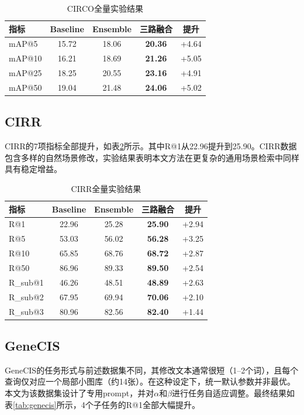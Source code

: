 \documentclass[12pt,a4paper,UTF8,oneside,openany]{ctexrep}
\begin{document}
\begin{table}[htbp]
\centering
\caption{CIRCO全量实验结果}
\label{tab:circo}
\small
\begin{tabular}{lcccc}
\toprule
指标 & Baseline & Ensemble & 三路融合 & 提升 \\
\midrule
mAP@5  & 15.72 & 18.06 & \textbf{20.36} & +4.64 \\
mAP@10 & 16.21 & 18.69 & \textbf{21.26} & +5.05 \\
mAP@25 & 18.25 & 20.55 & \textbf{23.16} & +4.91 \\
mAP@50 & 19.04 & 21.48 & \textbf{24.06} & +5.02 \\
\bottomrule
\end{tabular}
\end{table}


\subsection{CIRR}

CIRR的7项指标全部提升，如表\ref{tab:cirr}所示。其中R@1从22.96提升到25.90。CIRR数据包含多样的自然场景修改，实验结果表明本文方法在更复杂的通用场景检索中同样具有稳定增益。

\begin{table}[htbp]
\centering
\caption{CIRR全量实验结果}
\label{tab:cirr}
\small
\begin{tabular}{lcccc}
\toprule
指标 & Baseline & Ensemble & 三路融合 & 提升 \\
\midrule
R@1      & 22.96 & 25.28 & \textbf{25.90} & +2.94 \\
R@5      & 53.03 & 56.02 & \textbf{56.28} & +3.25 \\
R@10     & 65.85 & 68.76 & \textbf{68.72} & +2.87 \\
R@50     & 86.96 & 89.33 & \textbf{89.50} & +2.54 \\
R\_sub@1 & 46.26 & 48.51 & \textbf{48.89} & +2.63 \\
R\_sub@2 & 67.95 & 69.94 & \textbf{70.06} & +2.10 \\
R\_sub@3 & 80.96 & 82.56 & \textbf{82.40} & +1.44 \\
\bottomrule
\end{tabular}
\end{table}


\subsection{GeneCIS}

GeneCIS的任务形式与前述数据集不同，其修改文本通常很短（1--2个词），且每个查询仅对应一个局部小图库（约14张）。在这种设定下，统一默认参数并非最优。本文为该数据集设计了专用prompt，并对$\alpha$和$\beta$进行任务自适应调整。最终结果如表\ref{tab:genecis}所示，4个子任务的R@1全部大幅提升。
\end{document}
